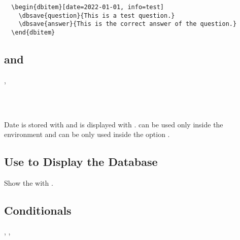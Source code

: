\documentclass[full]{l3doc}
\begin{document}
\begin{documentation}
\begin{verbatim}
  \begin{dbitem}[date=2022-01-01, info=test]
    \dbsave{question}{This is a test question.}
    \dbsave{answer}{This is the correct answer of the question.}
  \end{dbitem}
\end{verbatim}

\subsection{ and }

\begin{function}{\dbsave, \dbuse}
  \begin{syntax}
       \\
       \\
  \end{syntax}

  Date is stored with  and is displayed with .  
  can be used only inside the  environment and  can be
  only used inside the option .
\end{function}

\subsection{Use  to Display the Database}

\begin{function}{\dbshow}
  \begin{syntax}
      
  \end{syntax}

  Show the  with .
\end{function}

\subsection{Conditionals}

\begin{function}{\dbIfEmptyT, \dbIfEmptyF, \dbIfEmptyTF}
  \begin{syntax}
       \\
      \\
     
  \end{syntax}


\end{function}
\end{documentation}
\end{document}
